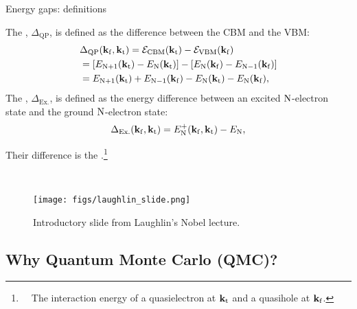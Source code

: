 \documentclass[12pt, pdf, hyperref={draft}, usenames, dvipsnames]{beamer}
\newcommand{\blue}[1]{{\bf\color{NavyBlue}{#1}}}
\newcommand{\kfr}{{\bf k}_{\rm f}}
\newcommand{\kto}{{\bf k}_{\rm t}}
\begin{document}
\begin{frame}{Energy gaps: definitions}

The \blue{quasiparticle gap}, $\Delta_{\text{QP}}$, is defined as the
difference between the CBM and the VBM:
\begin{align}
  &\Delta_{\text{QP}}(\kfr,\kto)={\cal E}_{\text{CBM}}(\kto)-
  {\cal E}_{\text{VBM}}(\kfr)
  \nonumber \\
  &=\left[E_{{\rm N}+1}(\kto)-E_{\rm N}(\kto)\right]-
    \left[E_{\rm N}(\kfr)-E_{{\rm N}-1}(\kfr)\right] \nonumber \\
  &=E_{{\rm N}+1}(\kto)+E_{{\rm N}-1}(\kfr)-E_{\rm N}(\kto)-E_{\rm N}(\kfr),
\end{align}
The \blue{excitonic gap}, $\Delta_{\text{Ex.}}$, is defined as the energy
difference between an excited $\rm N$-electron state and the ground
$\rm N$-electron state:
\begin{equation}
  \Delta_{\text{Ex.}}(\kfr,\kto) = E^{+}_{\rm N}(\kfr, \kto) - E_{\rm N},
\end{equation}

Their difference is the \blue{exciton binding}.\footnote{~~The interaction
energy of a quasielectron at $\kto$ and a quasihole at $\kfr$.}
\end{frame}

\begin{frame}{\ }
\vspace{-1cm}
\begin{figure}[H]
  \centering
  \texttt{[image: figs/laughlin\_slide.png]}
  \caption{Introductory slide from Laughlin's Nobel lecture.}
\label{fig:laughlin_slide}
\end{figure}
\end{frame}


\subsection{Why Quantum Monte Carlo (QMC)?}
\end{document}
